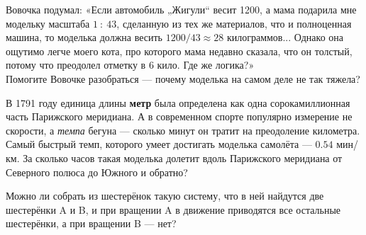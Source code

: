 ﻿
\begin{enumerate}
\itA Вовочка подумал: «Если автомобиль „Жигули“ весит \SI{1200}{}, а мама подарила мне модельку масштаба $1\ :\ 43$, сделанную из тех же материалов, что и полноценная машина, то моделька должна весить $1200 / 43 \approx 28$ килограммов... Однако она ощутимо легче моего кота, про которого мама недавно сказала, что он толстый, потому что преодолел отметку в 6 кило. Где же логика?» \smallskip \\
Помогите Вовочке разобраться — почему моделька на самом деле не так тяжела?

\itB В 1791 году единица длины {\bfseries метр} была определена как одна сорокамиллионная часть Парижского меридиана. А в современном спорте популярно измерение не скорости, а {\itshape темпа} бегуна — сколько минут он тратит на преодоление километра. \smallskip \\
Самый быстрый темп, которого умеет достигать моделька самолёта — $0.54$ мин/км. За сколько часов такая моделька долетит вдоль Парижского меридиана от Северного полюса до Южного и обратно?

\itC Можно ли собрать из шестерёнок такую систему, что в ней найдутся две шестерёнки A и B, и при вращении A в движение приводятся все остальные шестерёнки, а при вращении B — нет?
\end{enumerate}